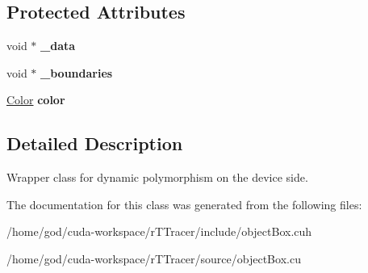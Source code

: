 \subsection*{Protected Attributes}
\begin{DoxyCompactItemize}
\item 
void $\ast$ {\bfseries \+\_\+data}\hypertarget{class_dev_object_a362a69178014a44d0179e0ff07e70be9}{}\label{class_dev_object_a362a69178014a44d0179e0ff07e70be9}

\item 
void $\ast$ {\bfseries \+\_\+boundaries}\hypertarget{class_dev_object_a8f034e3a80c5a29de6e2f0fc190cb267}{}\label{class_dev_object_a8f034e3a80c5a29de6e2f0fc190cb267}

\item 
\hyperlink{class_color}{Color} {\bfseries color}\hypertarget{class_dev_object_a00c4791a548e2f1a45493bc3cbefba6a}{}\label{class_dev_object_a00c4791a548e2f1a45493bc3cbefba6a}

\end{DoxyCompactItemize}


\subsection{Detailed Description}
Wrapper class for dynamic polymorphism on the device side. 

The documentation for this class was generated from the following files\+:\begin{DoxyCompactItemize}
\item 
/home/god/cuda-\/workspace/r\+T\+Tracer/include/object\+Box.\+cuh\item 
/home/god/cuda-\/workspace/r\+T\+Tracer/source/object\+Box.\+cu\end{DoxyCompactItemize}

